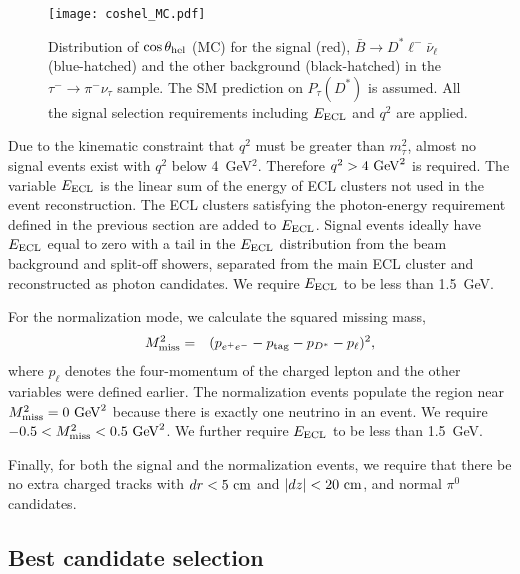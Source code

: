 \documentclass[aps,prd,twocolumn,superscriptaddress,showpacs,preprintnumbers,amsmath,amssymb]{revtex4-1}
\begin{document}
\begin{figure}[t!]
  \centering
  \texttt{[image: coshel\_MC.pdf]}
  \caption{Distribution of $\cos\theta_{\rm hel}$ (MC) for the signal (red), $\bar{B} \rightarrow D^* \ell^- \bar{\nu}_\ell$ (blue-hatched) and the other background (black-hatched) in the $\tau^- \rightarrow \pi^- \nu_\tau$ sample. The SM prediction on $P_\tau(D^*)$ is assumed. All the signal selection requirements including $E_{\rm ECL}$ and $q^2$ are applied.}
  \label{fig:coshel_peak}
\end{figure}

Due to the kinematic constraint that $q^2$ must be greater than $m_\tau^2$, almost no signal events exist with $q^2$ below 4~GeV$^2$. Therefore $q^2 > 4~{\rm GeV}^2$ is required. The variable $E_{\rm ECL}$ is the linear sum of the energy of ECL clusters not used in the event reconstruction. The ECL clusters satisfying the photon-energy requirement defined in the previous section are added to $E_{\rm ECL}$. Signal events ideally have $E_{\rm ECL}$ equal to zero with a tail in the $E_{\rm ECL}$ distribution from the beam background and split-off showers, separated from the main ECL cluster and reconstructed as photon candidates. We require $E_{\rm ECL}$ to be less than 1.5~GeV. 

For the normalization mode, we calculate the squared missing mass,
\begin{eqnarray}
  M_{\rm miss}^2 &=& (p_{e^+ e^-} - p_{\rm tag} - p_{D^*} - p_{\ell})^2,
\end{eqnarray} 
where $p_\ell$ denotes the four-momentum of the charged lepton and the other variables were defined earlier. The normalization events populate the region near $M_{\rm miss}^2 = 0~{\rm GeV}^2$ because there is exactly one neutrino in an event. We require $-0.5 < M_{\rm miss}^2 < 0.5~{\rm GeV}^2$. We further require $E_{\rm ECL}$ to be less than 1.5~GeV.

Finally, for both the signal and the normalization events, we require that there be no extra charged tracks with $dr < 5~{\rm cm}$ and $|dz| < 20~{\rm cm}$, and normal $\pi^0$ candidates.

\subsection{Best candidate selection}
\end{document}

